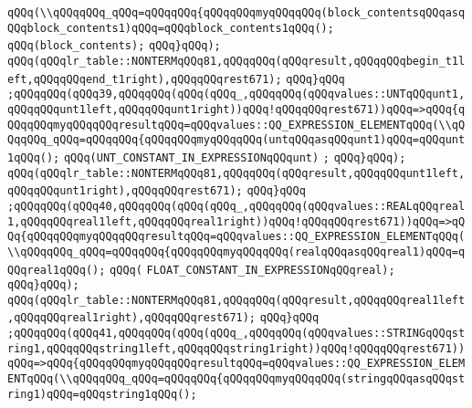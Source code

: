 \verb|qQQq(\\qQQqqQQq_qQQq=qQQqqQQq{qQQqqQQqmyqQQqqQQq(block_contentsqQQqasqQQqblock_contents1)qQQq=qQQqblock_contents1qQQq();|\newline
\verb|qQQq(block_contents);|\newline
\verb|qQQq}qQQq);|\newline
\verb|qQQq(qQQqlr_table::NONTERMqQQq81,qQQqqQQq(qQQqresult,qQQqqQQqbegin_t1left,qQQqqQQqend_t1right),qQQqqQQqrest671);|\newline
\verb|qQQq}qQQq|\newline
\verb|;qQQqqQQq(qQQq39,qQQqqQQq(qQQq(qQQq_,qQQqqQQq(qQQqvalues::UNTqQQqunt1,qQQqqQQqunt1left,qQQqqQQqunt1right))qQQq!qQQqqQQqrest671))qQQq=>qQQq{qQQqqQQqmyqQQqqQQqresultqQQq=qQQqvalues::QQ_EXPRESSION_ELEMENTqQQq(\\qQQqqQQq_qQQq=qQQqqQQq{qQQqqQQqmyqQQqqQQq(untqQQqasqQQqunt1)qQQq=qQQqunt1qQQq();|\newline
\verb|qQQq(UNT_CONSTANT_IN_EXPRESSIONqQQqunt)|\newline
\verb|;|\newline
\verb|qQQq}qQQq);|\newline
\verb|qQQq(qQQqlr_table::NONTERMqQQq81,qQQqqQQq(qQQqresult,qQQqqQQqunt1left,qQQqqQQqunt1right),qQQqqQQqrest671);|\newline
\verb|qQQq}qQQq|\newline
\verb|;qQQqqQQq(qQQq40,qQQqqQQq(qQQq(qQQq_,qQQqqQQq(qQQqvalues::REALqQQqreal1,qQQqqQQqreal1left,qQQqqQQqreal1right))qQQq!qQQqqQQqrest671))qQQq=>qQQq{qQQqqQQqmyqQQqqQQqresultqQQq=qQQqvalues::QQ_EXPRESSION_ELEMENTqQQq(\\qQQqqQQq_qQQq=qQQqqQQq{qQQqqQQqmyqQQqqQQq(realqQQqasqQQqreal1)qQQq=qQQqreal1qQQq();|\newline
\verb|qQQq(|\newline
\verb|FLOAT_CONSTANT_IN_EXPRESSIONqQQqreal);|\newline
\verb|qQQq}qQQq);|\newline
\verb|qQQq(qQQqlr_table::NONTERMqQQq81,qQQqqQQq(qQQqresult,qQQqqQQqreal1left,qQQqqQQqreal1right),qQQqqQQqrest671);|\newline
\verb|qQQq}qQQq|\newline
\verb|;qQQqqQQq(qQQq41,qQQqqQQq(qQQq(qQQq_,qQQqqQQq(qQQqvalues::STRINGqQQqstring1,qQQqqQQqstring1left,qQQqqQQqstring1right))qQQq!qQQqqQQqrest671))qQQq=>qQQq{qQQqqQQqmyqQQqqQQqresultqQQq=qQQqvalues::QQ_EXPRESSION_ELEMENTqQQq(\\qQQqqQQq_qQQq=qQQqqQQq{qQQqqQQqmyqQQqqQQq(stringqQQqasqQQqstring1)qQQq=qQQqstring1qQQq();|\newline
